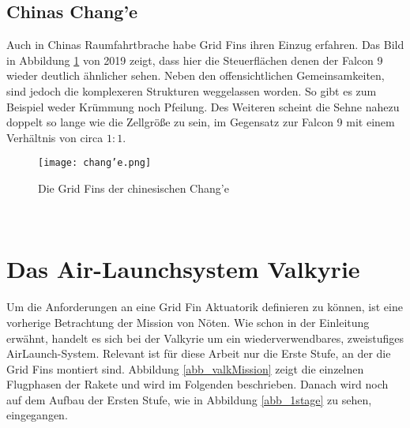 \subsection{Chinas Chang'e}
Auch in Chinas Raumfahrtbrache habe Grid Fins ihren Einzug erfahren. Das Bild in Abbildung \ref{abb_change} von 2019 zeigt, dass hier die Steuerflächen denen der Falcon 9 wieder deutlich ähnlicher sehen. Neben den offensichtlichen Gemeinsamkeiten, sind jedoch die komplexeren Strukturen weggelassen worden. So gibt es zum Beispiel weder Krümmung noch Pfeilung. Des Weiteren scheint die Sehne nahezu doppelt so lange wie die Zellgröße zu sein, im Gegensatz zur Falcon 9 mit einem Verhältnis von circa $1:1$.
\begin{figure}[h]
	\centering
	\texttt{[image: chang'e.png]}
	\begin{flushright}
	\end{flushright}
	\caption{Die Grid Fins der chinesischen Chang'e}
	\label{abb_change}
\end{figure}\\
\newpage
\section{Das Air-Launchsystem Valkyrie}
Um die Anforderungen an eine Grid Fin Aktuatorik definieren zu können, ist eine vorherige Betrachtung der Mission von Nöten. Wie schon in der Einleitung erwähnt, handelt es sich bei der Valkyrie um ein wiederverwendbares, zweistufiges AirLaunch-System.  Relevant ist für diese Arbeit nur die Erste Stufe, an der die Grid Fins montiert sind. Abbildung \ref{abb_valkMission} zeigt die einzelnen Flugphasen der Rakete und wird im Folgenden beschrieben.
Danach wird noch auf dem Aufbau der Ersten Stufe, wie in Abbildung \ref{abb_1stage} zu sehen, eingegangen.

